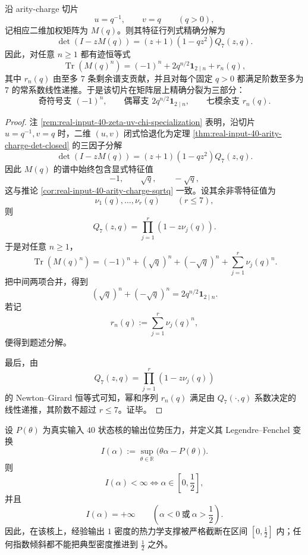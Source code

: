 \begin{theorem}\label{thm:conclusion-realinput40-arity-charge-z2-trace-splitting}
沿 arity-charge 切片
\[
u=q^{-1},\qquad v=q
\qquad (q>0),
\]
记相应二维加权矩阵为 \(M(q)\)。则其特征行列式精确分解为
\[
\det(I-zM(q))=(z+1)(1-qz^2)Q_7(z,q).
\]
因此，对任意 \(n\ge 1\) 都有迹恒等式
\[
\operatorname{Tr}(M(q)^n)=(-1)^n+2q^{n/2}\mathbf 1_{2\mid n}+r_n(q),
\]
其中 \(r_n(q)\) 由至多 \(7\) 条剩余谱支贡献，并且对每个固定 \(q>0\) 都满足阶数至多为 \(7\) 的常系数线性递推。于是该切片在矩阵层上精确分裂为三部分：
\[
\text{奇符号支 }(-1)^n,\qquad
\text{偶幂支 }2q^{n/2}\mathbf 1_{2\mid n},\qquad
\text{七模余支 }r_n(q).
\]
\end{theorem}
\begin{proof}
注 \ref{rem:real-input-40-zeta-uv-chi-specialization} 表明，沿切片 \(u=q^{-1},v=q\) 时，二维 \((u,v)\) 闭式恰退化为定理 \ref{thm:real-input-40-arity-charge-det-closed} 的三因子分解
\[
\det(I-zM(q))=(z+1)(1-qz^2)Q_7(z,q).
\]
因此 \(M(q)\) 的谱中始终包含显式特征值
\[
-1,\qquad \sqrt q,\qquad -\sqrt q,
\]
这与推论 \ref{cor:real-input-40-arity-charge-sqrtq} 一致。设其余非零特征值为
\[
\nu_1(q),\dots,\nu_r(q)
\qquad (r\le 7),
\]
则
\[
Q_7(z,q)=\prod_{j=1}^{r}(1-z\nu_j(q)).
\]
于是对任意 \(n\ge 1\)，
\[
\operatorname{Tr}(M(q)^n)
=
(-1)^n+(\sqrt q)^n+(-\sqrt q)^n+\sum_{j=1}^{r}\nu_j(q)^n.
\]
把中间两项合并，得到
\[
(\sqrt q)^n+(-\sqrt q)^n=2q^{n/2}\mathbf 1_{2\mid n}.
\]
若记
\[
r_n(q):=\sum_{j=1}^{r}\nu_j(q)^n,
\]
便得到题述分解。

最后，由
\[
Q_7(z,q)=\prod_{j=1}^{r}(1-z\nu_j(q))
\]
的 Newton--Girard 恒等式可知，幂和序列 \(r_n(q)\) 满足由 \(Q_7(\cdot,q)\) 系数决定的线性递推，其阶数不超过 \(r\le 7\)。证毕。
\end{proof}

\begin{theorem}[输出密度的半饱和支撑屏障]\label{thm:conclusion-realinput40-output-density-halfsaturation-support}
设 \(P(\theta)\) 为真实输入 \(40\) 状态核的输出位势压力，并定义其 Legendre--Fenchel 变换
\[
I(\alpha):=\sup_{\theta\in\mathbb R}\bigl(\theta\alpha-P(\theta)\bigr).
\]
则
\[
I(\alpha)<\infty \iff \alpha\in\left[0,\frac12\right],
\]
并且
\[
I(\alpha)=+\infty
\qquad
\left(\alpha<0\ \text{或}\ \alpha>\frac12\right).
\]
因此，在该核上，经验输出 \(1\) 密度的热力学支撑被严格截断在区间 \([0,\tfrac12]\) 内；任何指数倾斜都不能把典型密度推进到 \(\tfrac12\) 之外。
\end{theorem}

